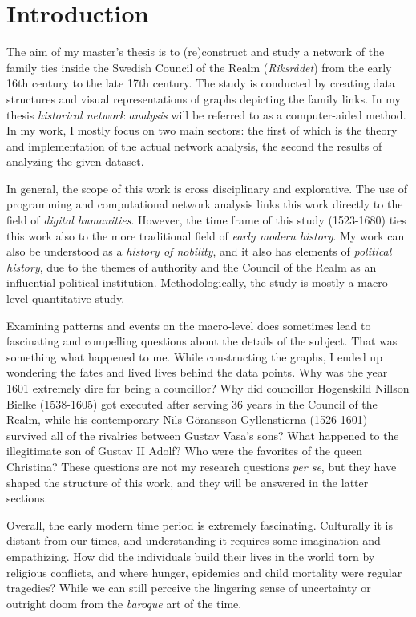 \section{Introduction}
The aim of my master's thesis is to (re)construct and study a network of the family ties inside the Swedish Council of the Realm (\textit{Riksrådet}) from the early 16th century to the late 17th century. The study is conducted by creating data structures and visual representations of graphs depicting the family links. In my thesis \textit{historical network analysis} will be referred to as a computer-aided method. In my work, I mostly focus on two main sectors: the first of which is the theory and implementation of the actual network analysis, the second the results of analyzing the given dataset.

In general, the scope of this work is cross disciplinary and explorative. The use of programming and computational network analysis links this work directly to the field of \textit{digital humanities}. However, the time frame of this study (1523-1680) ties this work also to the more traditional field of \textit{early modern history}. My work can also be understood as a \textit{history of nobility}, and it also has elements of \textit{political history}, due to the themes of authority and the Council of the Realm as an influential political institution. Methodologically, the study is mostly a macro-level quantitative study. 

Examining patterns and events on the macro-level does sometimes lead to fascinating and compelling questions about the details of the subject. That was something what happened to me. While constructing the graphs, I ended up wondering the fates and lived lives behind the data points. Why was the year 1601 extremely dire for being a councillor? Why did councillor Hogenskild Nillson Bielke (1538-1605) got executed after serving 36 years in the Council of the Realm, while his contemporary Nils Göransson Gyllenstierna (1526-1601) survived all of the rivalries between Gustav Vasa's sons? What happened to the illegitimate son of Gustav II Adolf? Who were the favorites of the  queen Christina? These questions are not my research questions \textit{per se}, but they have shaped the structure of this work, and they will be answered in the latter sections.   

Overall, the early modern time period is extremely fascinating. Culturally it is distant from our times, and understanding it requires some imagination and empathizing. How did the individuals build their lives in the world torn by religious conflicts, and where hunger, epidemics and child mortality were regular tragedies? While we can still perceive the lingering sense of uncertainty or outright doom from the \textit{baroque} art of the time.  

